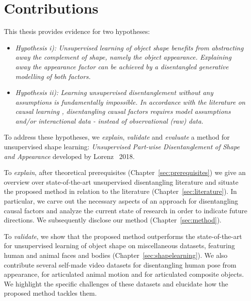 \section{Contributions}
	This thesis provides evidence for two hypotheses:
	\begin{itemize}
		\item  \textit{Hypothesis \emph{i)}: Unsupervised learning of object shape benefits from abstracting away the complement of shape, namely the object appearance. Explaining away the appearance factor can be achieved by a disentangled generative modelling of both factors.}
		\item \textit{Hypothesis \emph{ii)}: Learning unsupervised disentanglement without any assumptions is fundamentally impossible. In accordance with the literature on causal learning \cite{pearl18impediments}, disentangling causal factors requires model assumptions and/or interactional data - instead of observational (raw) data.}
	\end{itemize}
	To address these hypotheses, we \textit{explain}, \textit{validate} and \textit{evaluate} a method for unsupervised shape learning: \textit{Unsupervised Part-wise Disentanglement of Shape and Appearance} developed by Lorenz \etal\ 2018.


	To \textit{explain}, after theoretical prerequisites (Chapter~\ref{sec:prerequisites}) we give an overview over state-of-the-art unsupervised disentangling literature and situate the proposed method in relation to the literature (Chapter~\ref{sec:literature}). In particular, we carve out the necessary aspects of an approach for disentangling causal factors and analyze the current state of research in order to indicate future directions.
	We subsequently disclose our method (Chapter~\ref{sec:method}).


	To \textit{validate}, we show that the proposed method outperforms the state-of-the-art for unsupervised learning of object shape on miscellaneous datasets, featuring human and animal faces and bodies (Chapter~\ref{sec:shapelearning}).
	We also contribute several self-made video datasets for disentangling human pose from appearance, for articulated animal motion and for articulated composite objects. We highlight the specific challenges of these datasets and elucidate how the proposed method tackles them.


